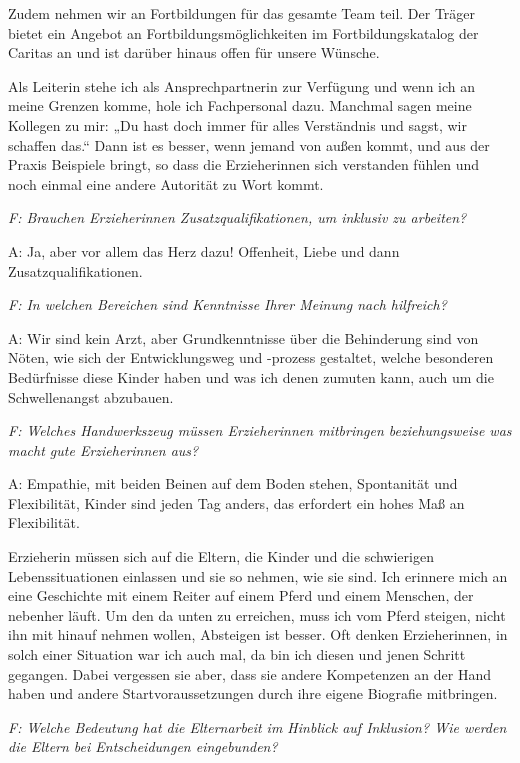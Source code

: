 \begin{linenumbers*}
Zudem nehmen wir an Fortbildungen für das gesamte Team teil. Der Träger bietet ein Angebot an Fortbildungsmöglichkeiten im Fortbildungskatalog der Caritas an und ist darüber hinaus offen für unsere Wünsche. 

Als Leiterin stehe ich als Ansprechpartnerin zur Verfügung und wenn ich an meine Grenzen komme, hole ich Fachpersonal dazu. Manchmal sagen meine Kollegen zu mir: „Du hast doch immer für alles Verständnis und sagst, wir schaffen das.“ Dann ist es besser, wenn jemand von außen kommt, und aus der Praxis Beispiele bringt, so dass die Erzieherinnen sich verstanden fühlen und noch einmal eine andere Autorität zu Wort kommt.  

\emph{F: Brauchen Erzieherinnen Zusatzqualifikationen, um inklusiv zu arbeiten?} 

A: Ja, aber vor allem das Herz dazu! Offenheit, Liebe und dann Zusatzqualifikationen. 

\emph{F: In welchen Bereichen sind Kenntnisse Ihrer Meinung nach hilfreich?}

A: Wir sind kein Arzt, aber Grundkenntnisse über die Behinderung sind von Nöten, wie sich der Entwicklungsweg und -prozess gestaltet, welche besonderen Bedürfnisse diese Kinder haben und was ich denen zumuten kann, auch um die Schwellenangst abzubauen. 

\emph{F: Welches Handwerkszeug müssen Erzieherinnen mitbringen beziehungsweise was macht gute Erzieherinnen aus?}

A: Empathie, mit beiden Beinen auf dem Boden stehen, Spontanität und Flexibilität, Kinder sind jeden Tag anders, das erfordert ein hohes Maß an Flexibilität. 

Erzieherin müssen sich auf die Eltern, die Kinder und die schwierigen Lebenssituationen einlassen und sie so nehmen, wie sie sind. Ich erinnere mich an eine Geschichte mit einem Reiter auf einem Pferd und einem Menschen, der nebenher läuft. Um den da unten zu erreichen, muss ich vom Pferd steigen, nicht ihn mit hinauf nehmen wollen, Absteigen ist besser. Oft denken Erzieherinnen, in solch einer Situation war ich auch mal, da bin ich diesen und jenen Schritt gegangen. Dabei vergessen sie aber, dass sie andere Kompetenzen an der Hand haben und andere Startvoraussetzungen durch ihre eigene Biografie mitbringen.  

\emph{F: Welche Bedeutung hat die Elternarbeit im Hinblick auf Inklusion?
Wie werden die Eltern bei Entscheidungen eingebunden?} 


\end{linenumbers*}
